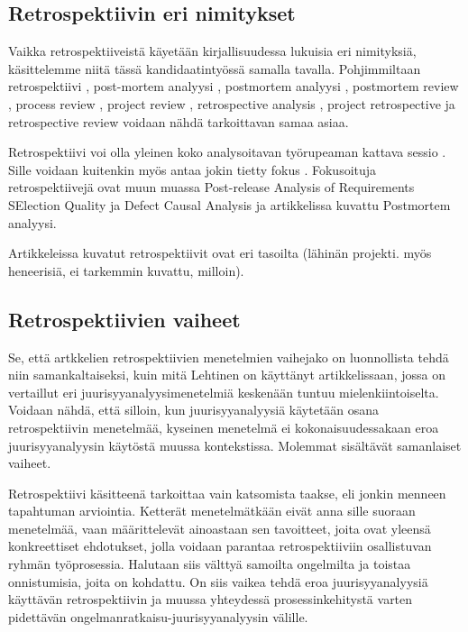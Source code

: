 \subsection{Retrospektiivin eri nimitykset}
Vaikka retrospektiiveistä käyetään kirjallisuudessa lukuisia eri nimityksiä, käsittelemme niitä tässä kandidaatintyössä samalla tavalla. Pohjimmiltaan retrospektiivi \citep{AgileRetros2006}, post-mortem analyysi \citep{staalhane2003post}, postmortem analyysi \citep{de2004learning}, postmortem review \citep{dingsoyr2003extending}, process review \citep{karlsson2006case}, project review \citep{karlsson2006case}, retrospective analysis \citep{karlsson2006case}, project retrospective \citep{karlsson2006case} ja retrospective review \citep{karlsson2006case} voidaan nähdä tarkoittavan samaa asiaa.

Retrospektiivi voi olla yleinen koko analysoitavan työrupeaman kattava sessio \citep{}. Sille voidaan kuitenkin myös antaa jokin tietty fokus \citep{}. Fokusoituja retrospektiivejä ovat muun muassa Post-release Analysis of Requirements SElection Quality \citep{karlsson2006case} ja Defect Causal Analysis \citep{card1998learning} ja artikkelissa \citep{de2004learning} kuvattu Postmortem analyysi.

Artikkeleissa kuvatut retrospektiivit ovat eri tasoilta (lähinän projekti. myös heneerisiä, ei tarkemmin kuvattu, milloin).

\subsection{Retrospektiivien vaiheet}
Se, että artkkelien retrospektiivien menetelmien vaihejako on luonnollista tehdä niin samankaltaiseksi, kuin mitä Lehtinen on käyttänyt artikkelissaan, jossa on vertaillut eri juurisyyanalyysimenetelmiä keskenään \citep{Lehtinen2011} tuntuu mielenkiintoiselta. Voidaan nähdä, että silloin, kun juurisyyanalyysiä käytetään osana retrospektiivin menetelmää, kyseinen menetelmä ei kokonaisuudessakaan eroa juurisyyanalyysin käytöstä muussa kontekstissa. Molemmat sisältävät samanlaiset vaiheet.

Retrospektiivi käsitteenä tarkoittaa vain katsomista taakse, eli jonkin menneen tapahtuman arviointia. Ketterät menetelmätkään eivät anna sille suoraan menetelmää, vaan määrittelevät ainoastaan sen tavoitteet, joita ovat yleensä konkreettiset ehdotukset, jolla voidaan parantaa retrospektiiviin osallistuvan ryhmän työprosessia. Halutaan siis välttyä samoilta ongelmilta ja toistaa onnistumisia, joita on kohdattu. On siis vaikea tehdä eroa juurisyyanalyysiä käyttävän retrospektiivin ja muussa yhteydessä prosessinkehitystä varten pidettävän ongelmanratkaisu-juurisyyanalyysin välille.

